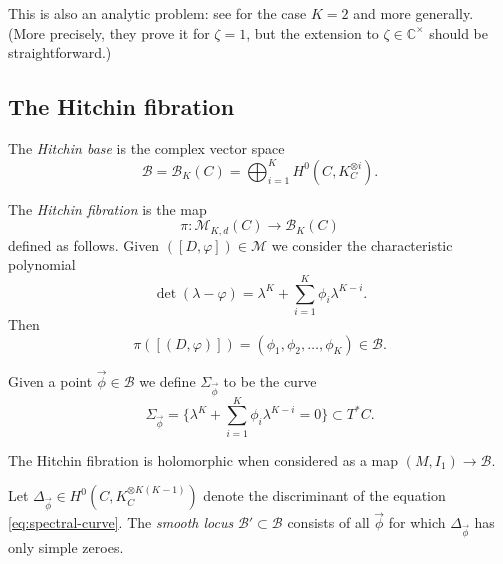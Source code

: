 \documentclass[12pt,letterpaper,reqno]{article}
\numberwithin{equation}{section}
\newcommand{\cB}{\ensuremath{\mathcal B}}
\newcommand{\cM}{\ensuremath{\mathcal M}}
\newcommand{\C}{\ensuremath{\mathbb C}}
\newcommand{\ti}[1]{\textit{#1}}
\begin{document}
\begin{pf} This is also an analytic problem: see \cite{MR887285} for 
the case $K=2$ and \cite{MR965220} more generally.
(More precisely, they prove it for $\zeta = 1$, but the extension
to $\zeta \in \C^\times$ should be straightforward.)
\end{pf}




\subsection{The Hitchin fibration}

\begin{defn} The \ti{Hitchin base} is the
complex vector space
\begin{equation}
  \cB = \cB_K(C) = \bigoplus_{i=1}^K H^0(C, K_C^{\otimes i}).
\end{equation}
\end{defn}

\begin{defn} The \ti{Hitchin fibration} is 
the map
\begin{equation}
  \pi: \cM_{K,d}(C) \to \cB_K(C)
\end{equation}
defined as follows. Given $([D,\varphi]) \in \cM$
we consider the characteristic polynomial
\begin{equation}
  \det (\lambda - \varphi) = \lambda^K + \sum_{i=1}^K \phi_i \lambda^{K-i}.
\end{equation}
Then
\begin{equation}
  \pi([(D,\varphi)]) = (\phi_1, \phi_2, \dots, \phi_K) \in \cB.
\end{equation}
\end{defn}
\begin{defn} Given a point $\vec\phi \in \cB$
we define $\Sigma_{\vec\phi}$ to be the curve
\begin{equation} \label{eq:spectral-curve}
  \Sigma_{\vec\phi} = \{ \lambda^K + \sum_{i=1}^K \phi_i \lambda^{K-i} = 0 \} \subset T^* C.
\end{equation}
\end{defn}

\begin{prop} The Hitchin fibration
is holomorphic when considered as a map $(M, I_1) \to \cB$.
\end{prop}

\begin{defn}
Let $\Delta_{\vec\phi} \in H^0(C, K_C^{\otimes K(K-1)})$ denote the discriminant of the 
equation \eqref{eq:spectral-curve}.
The \ti{smooth locus} $\cB' \subset \cB$ consists of all $\vec\phi$
for which $\Delta_{\vec\phi}$ has only simple zeroes.
\end{defn}
\end{document}
